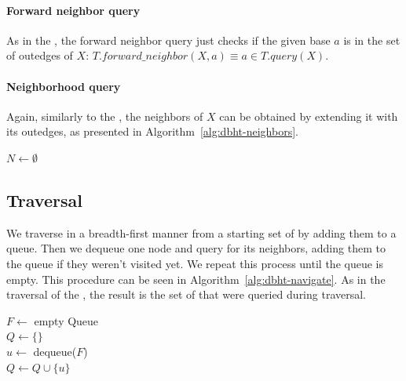 \paragraph*{Forward neighbor query} As in the \dBCM, the forward neighbor query just checks if the given base $a$ is in the set of outedges of $X$: $T.\mathit{forward\_neighbor}(X, a) \equiv a \in T.\mathit{query}(X)$.

\paragraph*{Neighborhood query} Again, similarly to the \dBCM, the neighbors of $X$ can be obtained by extending it with its outedges, as presented in Algorithm~\ref{alg:dbht-neighbors}.

\begin{algorithm}
	\caption{$T.\mathit{neighbors}(X)$}\label{alg:dbht-neighbors}
  $N \gets \emptyset$\\
\end{algorithm}

\subsection{\dBHT Traversal}

We traverse \dBHT in a breadth-first manner from a starting set of   by adding them to a queue. Then we dequeue one node and query for its neighbors, adding them to the queue if they weren't visited yet. We repeat this process until the queue is empty. This procedure can be seen in Algorithm~\ref{alg:dbht-navigate}. As in the traversal of the \dBCM, the result is the set of  that were queried during traversal.

\begin{algorithm}
	\caption{$T.\mathit{traverse}(\strsetname{S}, t)$}\label{alg:dbht-navigate}
  $F \gets$ empty Queue\\
  $Q \gets \{\}$\\
   {
    $u \gets$ dequeue($F$)\\
    $Q \gets Q \cup \{u\}$\\
  }
\end{algorithm}